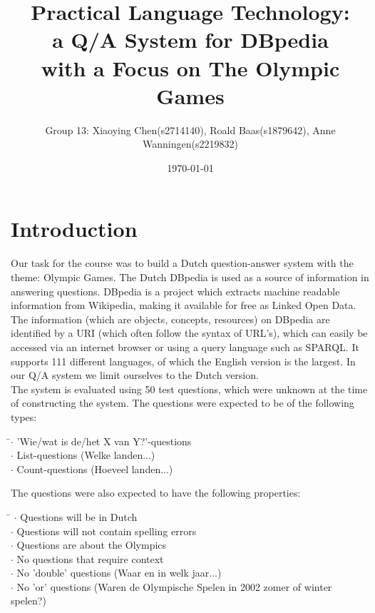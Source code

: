 \documentclass[a4paper,11pt]{article}
\title{ {\small Practical Language Technology:}\\{\Large a Q/A System for DBpedia}\\{\small with a Focus on The Olympic Games}}
\date{\today}
\author{
  {\small Group 13: }
  {\small Xiaoying Chen}{\tiny(s2714140)},
  {\small Roald Baas}{\tiny(s1879642)},
  {\small Anne Wanningen}{\tiny(s2219832)}
}
\begin{document}
\maketitle
\section{Introduction}
Our task for the course was to build a Dutch question-answer system with the theme: Olympic Games. The Dutch DBpedia is used as a source of information in answering questions. DBpedia is a project which extracts machine readable information from Wikipedia, making it available for free as Linked Open Data. The information (which are objects, concepts, resources) on DBpedia are identified by a URI (which often follow the syntax of URL's), which can easily be accessed via an internet browser or using a query language such as SPARQL. It supports 111 different languages, of which the English version is the largest. In our Q/A system we limit ourselves to the Dutch version.\vspace{2mm}\\
The system is evaluated using 50 test questions, which were unknown at the time of constructing the system. The questions were expected to be of the following types:
\begin{tabbing}
\hspace{4mm}\=$\cdot$ 'Wie/wat is de/het X van Y?'-questions\\
\> $\cdot$ List-questions (Welke landen...)\\
\> $\cdot$ Count-questions (Hoeveel landen...)
\end{tabbing}\vspace{2mm}
The questions were also expected to have the following properties:
\begin{tabbing}
\hspace{4mm}\= $\cdot$ Questions will be in Dutch\\
\> $\cdot$ Questions will not contain spelling errors\\
\> $\cdot$ Questions are about the Olympics\\
\> $\cdot$ No questions that require context\\
\> $\cdot$ No 'double' questions (Waar en in welk jaar...)\\
\> $\cdot$ No 'or' questions (Waren de Olympische Spelen in 2002 zomer of winter spelen?)\\
\end{tabbing}\vspace{2mm}
\end{document}
